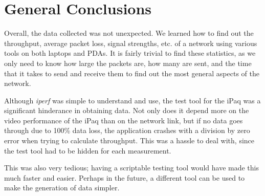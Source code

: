 \documentclass[11pt]{article}
\begin{document}
\section{General Conclusions}

Overall, the data collected was not unexpected. We learned how to find out the throughput, average packet loss, signal strengths, etc. of a network using various tools on both laptops and PDAs. It is fairly trivial to find these statistics, as we only need to know how large the packets are, how many are sent, and the time that it takes to send and receive them to find out the most general aspects of the network.

Although \emph{iperf} was simple to understand and use, the test tool for the iPaq was a significant hinderance in obtaining data. Not only does it depend more on the video performance of the iPaq than on the network link, but if no data goes through due to 100\% data loss, the application crashes with a division by zero error when trying to calculate throughput. This was a hassle to deal with, since the test tool had to be hidden for each measurement.

This was also very tedious; having a scriptable testing tool would have made this much faster and easier. Perhaps in the future, a different tool can be used to make the generation of data simpler. 
\end{document}
